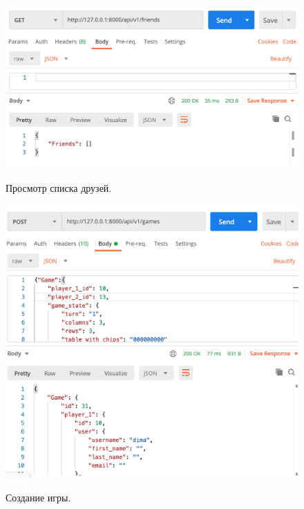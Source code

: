 \documentclass[a4paper,14pt]{extarticle}
\begin{document}
 	\begin{figure}[h!]
 		\begin{center}
 			{\includegraphics[scale = 0.5]{img/friends.png}}
 			\label{ris:friends}
 		\end{center}
 		\caption{Просмотр списка друзей.}
 	\end{figure}
 
 	\newpage
 
 	\begin{figure}[h!]
 		\begin{center}
 			{\includegraphics[scale = 0.5]{img/create_game.png}}
 			\label{ris:create_game}
 		\end{center}
 		\caption{Создание игры.}
 	\end{figure}
 
\end{document}
